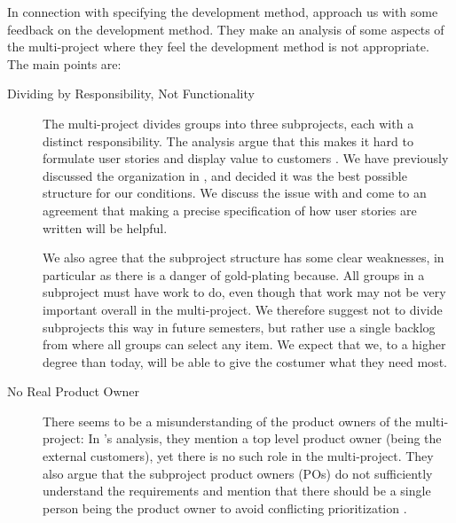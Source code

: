 In connection with specifying the development method,  approach us with some feedback on the development method. They make an analysis of some aspects of the multi-project where they feel the development method is not appropriate\cite{processanalysis}. The main points are: 
\begin{description}
  \item[Dividing by Responsibility, Not Functionality] The multi-project divides groups into three subprojects, each with a distinct responsibility. The analysis argue that this makes it hard to formulate user stories and display value to customers \cite{processanalysis}. We have previously discussed the organization in , and decided it was the best possible structure for our conditions. We discuss the issue with  and come to an agreement that making a precise specification of how user stories are written will be helpful.

We also agree that the subproject structure has some clear weaknesses, in particular as there is a danger of gold-plating because. All groups in a subproject must have work to do, even though that work may not be very important overall in the multi-project. We therefore suggest not to divide subprojects this way in future semesters, but rather use a single backlog from where all groups can select any item. We expect that we, to a higher degree than today, will be able to give the costumer what they need most.
  \item[No Real Product Owner] There seems to be a misunderstanding of the product owners of the multi-project: In 's analysis, they mention a top level product owner (being the external customers), yet there is no such role in the multi-project. They also argue that the subproject product owners (POs) do not sufficiently understand the requirements and mention that there should be a single person being the product owner to avoid conflicting prioritization \cite{processanalysis}.


\end{description}
